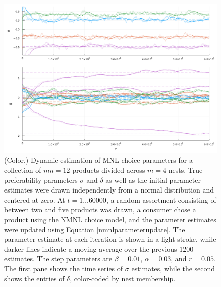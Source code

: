 \documentclass[preprint,12pt,authoryear]{elsarticle}
\begin{document}
\begin{figure}
\begin{center}\includegraphics[width=\linewidth, ]{param-est-dynamic-nested.png}\end{center}
\captionsetup{singlelinecheck=off}
    \caption[.]{(Color.) Dynamic estimation of MNL choice parameters for a collection of $mn = 12$ products divided across $m=4$ nests. True preferability parameters $\sigma$ and $\delta$ as well as the initial parameter estimates were drawn independently from a normal distribution and centered at zero. At $t = 1 \dots 60000$, a random assortment consisting of between two and five products was drawn, a consumer chose a product using the NMNL choice model, and the parameter estimates were updated using Equation \ref{nmnlparameterupdate}. The parameter estimate at each iteration is shown in a light stroke, while darker lines indicate a moving average over the previous 1200 estimates. The step parameters are $\beta = 0.01$, $\alpha = 0.03$, and $r = 0.05$. The first pane shows the time series of $\sigma$ estimates, while the second shows the entries of $\delta$, color-coded by nest membership.}
\label{param-est-dynamic-nested}
\end{figure}
\end{document}
